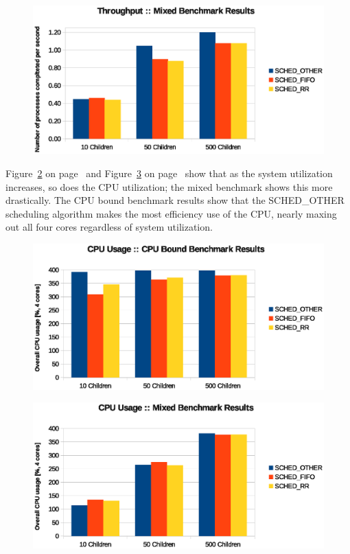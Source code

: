 \begin{figure}[H]
  \centering
  \includegraphics[scale=0.8]{img/mix-thruput-child.eps}
  \caption{}
  \label{fig:mix-thruput-child}
\end{figure}

Figure~\ref{fig:cpu-usage-child} on page~\pageref{fig:cpu-usage-child} and Figure~\ref{fig:mix-usage-child} on page~\pageref{fig:mix-usage-child} show that as the system utilization increases, so does the CPU utilization; the mixed benchmark shows this more drastically.  The CPU bound benchmark results show that the SCHED\_OTHER scheduling algorithm makes the most efficiency use of the CPU, nearly maxing out all four cores regardless of system utilization.

\begin{figure}[H]
  \centering
  \includegraphics[scale=0.8]{img/cpu-usage-child.eps}
  \caption{}
  \label{fig:cpu-usage-child}
\end{figure}

\begin{figure}[H]
  \centering
  \includegraphics[scale=0.8]{img/mix-usage-child.eps}
  \caption{}
  \label{fig:mix-usage-child}
\end{figure}
